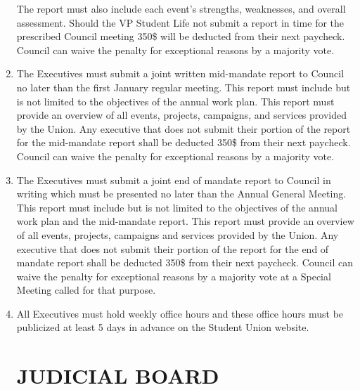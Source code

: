 \documentclass[oneside]{book}
\begin{document}
\begin{enumerate}
The report must also include each event\textquoteright{}s strengths,
weaknesses, and overall assessment. Should the VP Student Life not
submit a report in time for the prescribed Council meeting 350\$ will
be deducted from their next paycheck. Council can waive the penalty
for exceptional reasons by a majority vote.
\item The Executives must submit a joint written mid-mandate report to Council
no later than the first January regular meeting. This report must
include but is not limited to the objectives of the annual work plan.
This report must provide an overview of all events, projects, campaigns,
and services provided by the Union. Any executive that does not submit
their portion of the report for the mid-mandate report shall be deducted
350\$ from their next paycheck. Council can waive the penalty for
exceptional reasons by a majority vote.
\item The Executives must submit a joint end of mandate report to Council
in writing which must be presented no later than the Annual General
Meeting. This report must include but is not limited to the objectives
of the annual work plan and the mid-mandate report. This report must
provide an overview of all events, projects, campaigns and services
provided by the Union. Any executive that does not submit their portion
of the report for the end of mandate report shall be deducted 350\$
from their next paycheck. Council can waive the penalty for exceptional
reasons by a majority vote at a Special Meeting called for that purpose.
\item All Executives must hold weekly office hours and these office hours must be publicized at least 5 days in advance on the Student Union website. 

\part{\label{JUDICIAL_BOARD}JUDICIAL BOARD }

\end{enumerate}
\end{document}

